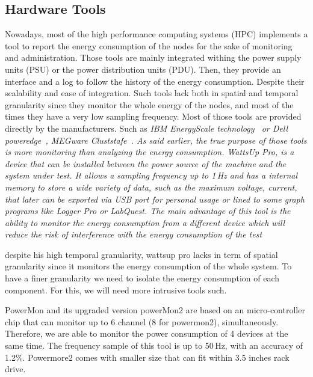 \subsection{Hardware Tools}
Nowadays, most of the high performance computing systems (HPC) implements a tool to report the energy consumption of the nodes for the sake of monitoring and administration.
Those tools are mainly integrated withing the power supply units (PSU) or the power distribution units (PDU).
Then, they provide an interface and a log to follow the history of the energy consumption.
Despite their scalability and ease of integration.
Such tools lack both in spatial and temporal granularity since they monitor the whole energy of the nodes, and most of the times they have a very low sampling frequency.
Most of those tools are provided directly by the manufacturers.
Such as \em{IBM EnergyScale technology}~\cite{mccreary2007energyscale,caldeira2014ibm,caldeiraibm} or \em{Dell poweredge}~\cite{lovicott2009thermal}, MEGware Cluststafe~\cite{breitbart2015case}.
As said earlier, the true purpose of those tools is more monitoring than analyzing the energy consumption.
WattsUp Pro, is a device that can be installed between the power source of the machine and the system under test.
It allows a sampling frequency up to 1\,Hz and has a internal memory to store a wide variety of data, such as the maximum voltage, current, that later can be exported via USB port for personal usage or lined to some graph programs like Logger Pro or LabQuest.
The main advantage of this tool is the ability to monitor the energy consumption from a different device which will reduce the risk of interference with the energy consumption of the test %
\cite{hirst2013watts}

despite his high temporal granularity, wattsup pro lacks in term of spatial granularity since it monitors the energy consumption of the whole system.
To have a finer granularity we need to isolate the energy consumption of each component.
For this, we will need more intrusive tools such.



PowerMon and its upgraded version powerMon2 \cite{bedard2010powermon} are based on an micro-controller chip that can monitor up to 6 channel (8 for powermon2), simultaneously.
Therefore, we are able to monitor the power consumption of 4 devices at the same time.
The frequency sample of this tool is up to 50\,Hz, with an accuracy of 1.2\%.
Powermore2 comes with smaller size that can fit within 3.5 inches rack drive.

